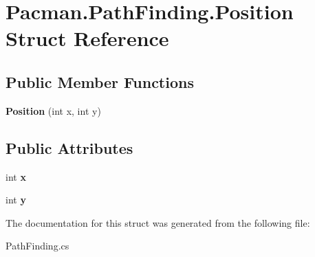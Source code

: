 \hypertarget{struct_pacman_1_1_path_finding_1_1_position}{\section{Pacman.\-Path\-Finding.\-Position Struct Reference}
\label{struct_pacman_1_1_path_finding_1_1_position}
}
\subsection*{Public Member Functions}
\begin{DoxyCompactItemize}
\item 
\hypertarget{struct_pacman_1_1_path_finding_1_1_position_a27ad3ace449adbbf211deebff53c7133}{{\bfseries Position} (int x, int y)}\label{struct_pacman_1_1_path_finding_1_1_position_a27ad3ace449adbbf211deebff53c7133}

\end{DoxyCompactItemize}
\subsection*{Public Attributes}
\begin{DoxyCompactItemize}
\item 
\hypertarget{struct_pacman_1_1_path_finding_1_1_position_a3ba72b69e0c2b9a9e1298f0696f95c27}{int {\bfseries x}}\label{struct_pacman_1_1_path_finding_1_1_position_a3ba72b69e0c2b9a9e1298f0696f95c27}

\item 
\hypertarget{struct_pacman_1_1_path_finding_1_1_position_aede85751ad51b3d8e4a5788332898d7b}{int {\bfseries y}}\label{struct_pacman_1_1_path_finding_1_1_position_aede85751ad51b3d8e4a5788332898d7b}

\end{DoxyCompactItemize}


The documentation for this struct was generated from the following file\-:\begin{DoxyCompactItemize}
\item 
Path\-Finding.\-cs\end{DoxyCompactItemize}
